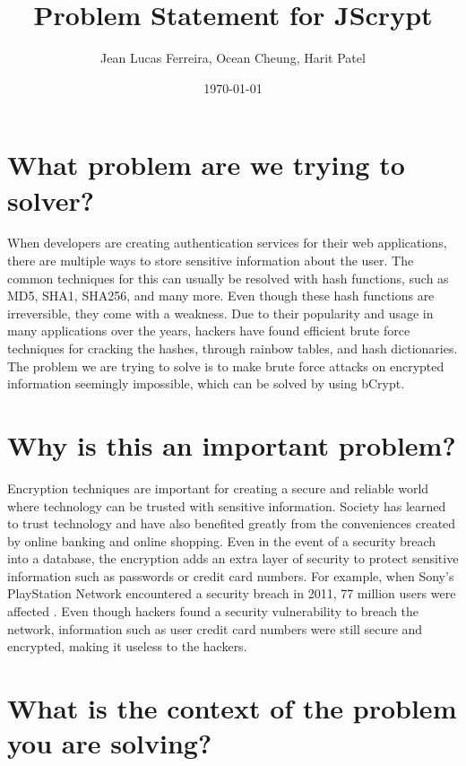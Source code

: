\documentclass[12pt]{article}
\begin{document}
\title{Problem Statement for JScrypt} 
\author{Jean Lucas Ferreira, Ocean Cheung, Harit Patel}

\date{\today}
	
\maketitle

\section{What problem are we trying to solver?}
	When developers are creating authentication services for their web applications, there are multiple ways to store sensitive information about the user. The common techniques for this can usually be resolved with hash functions, such as MD5, SHA1, SHA256, and many more. Even though these hash functions are irreversible, they come with a weakness. Due to their popularity and usage in many applications over the years, hackers have found efficient brute force techniques for cracking the hashes, through rainbow tables, and hash dictionaries. The problem we are trying to solve is to make brute force attacks on encrypted information seemingly impossible, which can be solved by using bCrypt.


\section{Why is this an important problem?}

	Encryption techniques are important for creating a secure and reliable world where technology can be trusted with sensitive information. Society has learned to trust technology and have also benefited greatly from the conveniences created by online banking and online shopping. Even in the event of a security breach into a database, the encryption adds an extra layer of security to protect sensitive information such as passwords or credit card numbers. For example, when Sony’s PlayStation Network encountered a security breach in 2011, 77 million users were affected \cite{sonyCite}. Even though hackers found a security vulnerability to breach the network, information such as user credit card numbers were still secure and encrypted, making it useless to the hackers.

 \section{What is the context of the problem you are solving?}
\end{document}
